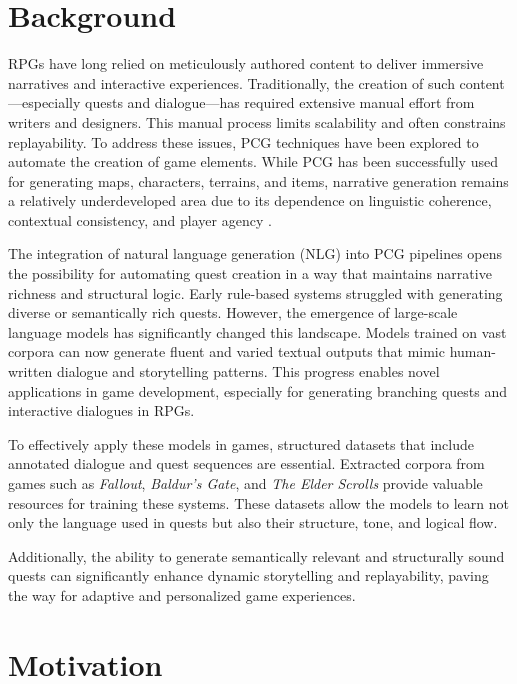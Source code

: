 \section{Background}

RPGs have long relied on meticulously authored content to deliver immersive narratives
and interactive experiences. Traditionally, the creation of such content—especially quests
and dialogue—has required extensive manual effort from writers and designers. This
manual process limits scalability and often constrains replayability. To address these
issues, PCG techniques have been explored to automate the creation of game elements.
While PCG has been successfully used for generating maps, characters, terrains, and
items, narrative generation remains a relatively underdeveloped area due to its dependence
on linguistic coherence, contextual consistency, and player agency \cite{togelius2013procedural}.

The integration of natural language generation (NLG) into PCG pipelines opens the
possibility for automating quest creation in a way that maintains narrative richness and
structural logic. Early rule-based systems struggled with generating diverse or semantically
rich quests. However, the emergence of large-scale language models has significantly
changed this landscape. Models trained on vast corpora can now generate fluent
and varied textual outputs that mimic human-written dialogue and storytelling patterns.
This progress enables novel applications in game development, especially for generating
branching quests and interactive dialogues in RPGs.

To effectively apply these models in games, structured datasets that include annotated
dialogue and quest sequences are essential. Extracted corpora from games such as \textit{Fallout},
\textit{Baldur's Gate}, and \textit{The Elder Scrolls} provide valuable resources for training these systems.
These datasets allow the models to learn not only the language used in quests but also
their structure, tone, and logical flow.

Additionally, the ability to generate semantically relevant and structurally sound
quests can significantly enhance dynamic storytelling and replayability, paving the way
for adaptive and personalized game experiences.

\section{Motivation}

